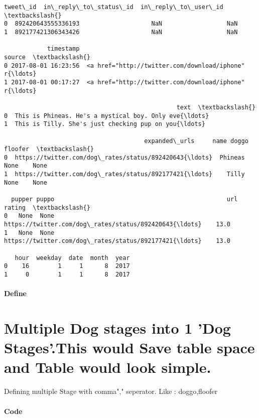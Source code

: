 \documentclass[11pt]{article}
\begin{document}
    \begin{Verbatim}[commandchars=\\\{\}]
             tweet\_id  in\_reply\_to\_status\_id  in\_reply\_to\_user\_id  \textbackslash{}
0  892420643555336193                    NaN                  NaN   
1  892177421306343426                    NaN                  NaN   

            timestamp                                             source  \textbackslash{}
0 2017-08-01 16:23:56  <a href="http://twitter.com/download/iphone" r{\ldots}   
1 2017-08-01 00:17:27  <a href="http://twitter.com/download/iphone" r{\ldots}   

                                                text  \textbackslash{}
0  This is Phineas. He's a mystical boy. Only eve{\ldots}   
1  This is Tilly. She's just checking pup on you{\ldots}   

                                       expanded\_urls     name doggo floofer  \textbackslash{}
0  https://twitter.com/dog\_rates/status/892420643{\ldots}  Phineas  None    None   
1  https://twitter.com/dog\_rates/status/892177421{\ldots}    Tilly  None    None   

  pupper puppo                                                url  rating  \textbackslash{}
0   None  None  https://twitter.com/dog\_rates/status/892420643{\ldots}    13.0   
1   None  None  https://twitter.com/dog\_rates/status/892177421{\ldots}    13.0   

   hour  weekday  date  month  year  
0    16        1     1      8  2017  
1     0        1     1      8  2017  

    \end{Verbatim}

    \paragraph{Define}\label{define}

\section{Multiple Dog stages into 1 'Dog Stages'.This would Save table
space and Table would look
simple.}\label{multiple-dog-stages-into-1-dog-stages.this-would-save-table-space-and-table-would-look-simple.}

Defining multiple Stage with comma"," seperator. Like : doggo,floofer

    \paragraph{Code}\label{code}
\end{document}
